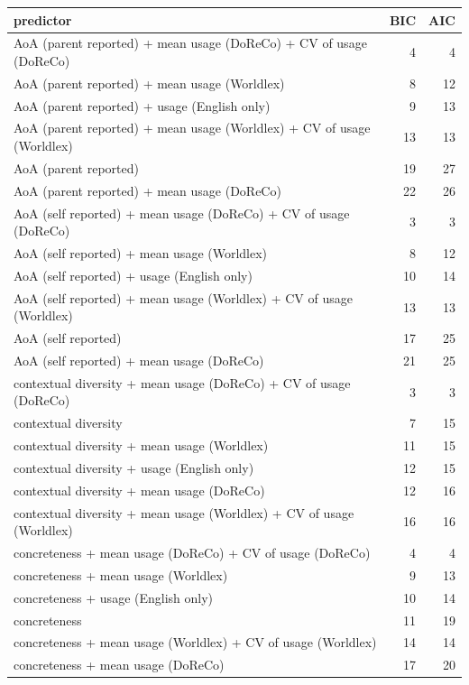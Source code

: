 \begin{table}[ht]
\centering
\begin{tabular}{lrr}
  \hline
predictor & BIC & AIC \\ 
  \hline
AoA (parent reported) + mean usage (DoReCo) + CV of usage (DoReCo) & 4 & 4 \\ 
  AoA (parent reported) + mean usage (Worldlex) & 8 & 12 \\ 
  AoA (parent reported) + usage (English only) & 9 & 13 \\ 
  AoA (parent reported) + mean usage (Worldlex) + CV of usage (Worldlex) & 13 & 13 \\ 
  AoA (parent reported) & 19 & 27 \\ 
  AoA (parent reported) + mean usage (DoReCo) & 22 & 26 \\ 
  AoA (self reported) + mean usage (DoReCo) + CV of usage (DoReCo) & 3 & 3 \\ 
  AoA (self reported) + mean usage (Worldlex) & 8 & 12 \\ 
  AoA (self reported) + usage (English only) & 10 & 14 \\ 
  AoA (self reported) + mean usage (Worldlex) + CV of usage (Worldlex) & 13 & 13 \\ 
  AoA (self reported) & 17 & 25 \\ 
  AoA (self reported) + mean usage (DoReCo) & 21 & 25 \\ 
  contextual diversity + mean usage (DoReCo) + CV of usage (DoReCo) & 3 & 3 \\ 
  contextual diversity & 7 & 15 \\ 
  contextual diversity + mean usage (Worldlex) & 11 & 15 \\ 
  contextual diversity + usage (English only) & 12 & 15 \\ 
  contextual diversity + mean usage (DoReCo) & 12 & 16 \\ 
  contextual diversity + mean usage (Worldlex) + CV of usage (Worldlex) & 16 & 16 \\ 
  concreteness + mean usage (DoReCo) + CV of usage (DoReCo) & 4 & 4 \\ 
  concreteness + mean usage (Worldlex) & 9 & 13 \\ 
  concreteness + usage (English only) & 10 & 14 \\ 
  concreteness & 11 & 19 \\ 
  concreteness + mean usage (Worldlex) + CV of usage (Worldlex) & 14 & 14 \\ 
  concreteness + mean usage (DoReCo) & 17 & 20 \\ 

\end{tabular}
\end{table}
